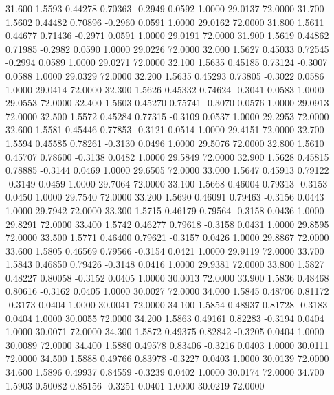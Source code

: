   31.600   1.5593   0.44278   0.70363  -0.2949   0.0592   1.0000  29.0137  72.0000
  31.700   1.5602   0.44482   0.70896  -0.2960   0.0591   1.0000  29.0162  72.0000
  31.800   1.5611   0.44677   0.71436  -0.2971   0.0591   1.0000  29.0191  72.0000
  31.900   1.5619   0.44862   0.71985  -0.2982   0.0590   1.0000  29.0226  72.0000
  32.000   1.5627   0.45033   0.72545  -0.2994   0.0589   1.0000  29.0271  72.0000
  32.100   1.5635   0.45185   0.73124  -0.3007   0.0588   1.0000  29.0329  72.0000
  32.200   1.5635   0.45293   0.73805  -0.3022   0.0586   1.0000  29.0414  72.0000
  32.300   1.5626   0.45332   0.74624  -0.3041   0.0583   1.0000  29.0553  72.0000
  32.400   1.5603   0.45270   0.75741  -0.3070   0.0576   1.0000  29.0913  72.0000
  32.500   1.5572   0.45284   0.77315  -0.3109   0.0537   1.0000  29.2953  72.0000
  32.600   1.5581   0.45446   0.77853  -0.3121   0.0514   1.0000  29.4151  72.0000
  32.700   1.5594   0.45585   0.78261  -0.3130   0.0496   1.0000  29.5076  72.0000
  32.800   1.5610   0.45707   0.78600  -0.3138   0.0482   1.0000  29.5849  72.0000
  32.900   1.5628   0.45815   0.78885  -0.3144   0.0469   1.0000  29.6505  72.0000
  33.000   1.5647   0.45913   0.79122  -0.3149   0.0459   1.0000  29.7064  72.0000
  33.100   1.5668   0.46004   0.79313  -0.3153   0.0450   1.0000  29.7540  72.0000
  33.200   1.5690   0.46091   0.79463  -0.3156   0.0443   1.0000  29.7942  72.0000
  33.300   1.5715   0.46179   0.79564  -0.3158   0.0436   1.0000  29.8291  72.0000
  33.400   1.5742   0.46277   0.79618  -0.3158   0.0431   1.0000  29.8595  72.0000
  33.500   1.5771   0.46400   0.79621  -0.3157   0.0426   1.0000  29.8867  72.0000
  33.600   1.5805   0.46569   0.79566  -0.3154   0.0421   1.0000  29.9119  72.0000
  33.700   1.5843   0.46850   0.79426  -0.3148   0.0416   1.0000  29.9381  72.0000
  33.800   1.5827   0.48227   0.80058  -0.3152   0.0405   1.0000  30.0013  72.0000
  33.900   1.5836   0.48468   0.80616  -0.3162   0.0405   1.0000  30.0027  72.0000
  34.000   1.5845   0.48706   0.81172  -0.3173   0.0404   1.0000  30.0041  72.0000
  34.100   1.5854   0.48937   0.81728  -0.3183   0.0404   1.0000  30.0055  72.0000
  34.200   1.5863   0.49161   0.82283  -0.3194   0.0404   1.0000  30.0071  72.0000
  34.300   1.5872   0.49375   0.82842  -0.3205   0.0404   1.0000  30.0089  72.0000
  34.400   1.5880   0.49578   0.83406  -0.3216   0.0403   1.0000  30.0111  72.0000
  34.500   1.5888   0.49766   0.83978  -0.3227   0.0403   1.0000  30.0139  72.0000
  34.600   1.5896   0.49937   0.84559  -0.3239   0.0402   1.0000  30.0174  72.0000
  34.700   1.5903   0.50082   0.85156  -0.3251   0.0401   1.0000  30.0219  72.0000
